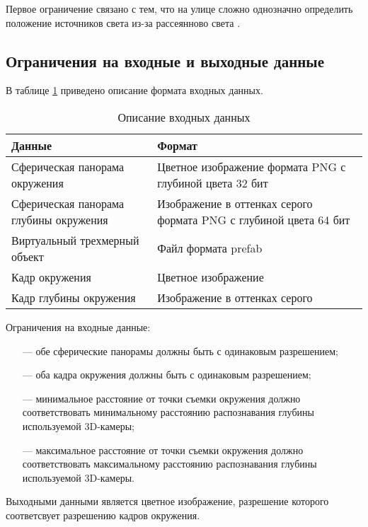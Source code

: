 Первое ограничение связано с тем, что на улице сложно однозначно определить положение источников света из-за рассеянново света \cite{osti2019real}. 

\subsection{Ограничения на входные и выходные данные}

В таблице \ref{FormatData} приведено описание формата входных данных.

\begin{table}[H]
	\caption{Описание входных данных}
	\label{FormatData}
	\begin{center}
		\begin{tabular}{| p{6 cm} | p{9 cm} |} 
			\hline
			Данные & Формат \\
			\hline
			Сферическая панорама окружения & Цветное изображение формата PNG с глубиной цвета 32 бит \\
			\hline
			Сферическая панорама глубины окружения & Изображение в оттенках серого формата PNG с глубиной цвета 64 бит \\
			\hline
			Виртуальный трехмерный объект & Файл формата prefab \\
			\hline
			Кадр окружения & Цветное изображение \\
			\hline
			Кадр глубины окружения & Изображение в оттенках серого \\
			\hline
		\end{tabular}
	\end{center}
\end{table}

Ограничения на входные данные:

\begin{itemize}
	\item[---] обе сферические панорамы должны быть с одинаковым разрешением;
	\item[---] оба кадра окружения должны быть с одинаковым разрешением;
	\item[---] минимальное расстояние от точки съемки окружения должно соответствовать минимальному расстоянию распознавания глубины используемой 3D-камеры;
	\item[---] максимальное расстояние от точки съемки окружения должно соответствовать максимальному расстоянию распознавания глубины используемой 3D-камеры.
\end{itemize}

Выходными данными является цветное изображение, разрешение которого соответсвует разрешению кадров окружения.

